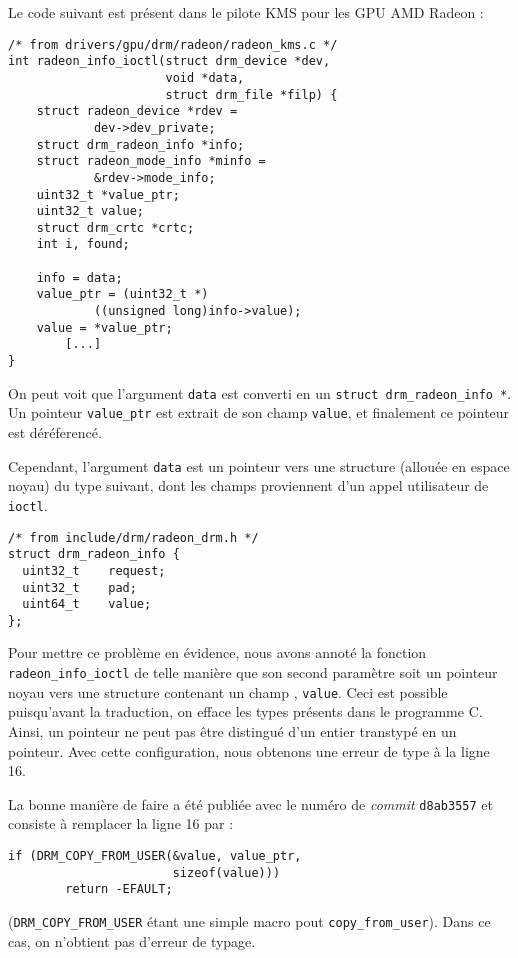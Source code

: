 Le code suivant est présent dans le pilote KMS pour les GPU AMD Radeon :

\begin{verbatim}
/* from drivers/gpu/drm/radeon/radeon_kms.c */
int radeon_info_ioctl(struct drm_device *dev,
                      void *data,
                      struct drm_file *filp) {
	struct radeon_device *rdev =
            dev->dev_private;
	struct drm_radeon_info *info;
	struct radeon_mode_info *minfo =
            &rdev->mode_info;
	uint32_t *value_ptr;
	uint32_t value;
	struct drm_crtc *crtc;
	int i, found;

	info = data;
	value_ptr = (uint32_t *)
            ((unsigned long)info->value);
	value = *value_ptr;
        [...]
}
\end{verbatim}

On peut voit que l'argument \texttt{data} est converti en un \texttt{struct
drm\_radeon\_info *}. Un pointeur \texttt{value\_ptr} est extrait de son champ
\texttt{value}, et finalement ce pointeur est déréferencé.

Cependant, l'argument \texttt{data} est un pointeur vers une structure (allouée
en espace noyau) du type suivant, dont les champs proviennent d'un appel
utilisateur de \texttt{ioctl}.

\begin{verbatim}
/* from include/drm/radeon_drm.h */
struct drm_radeon_info {
  uint32_t    request;
  uint32_t    pad;
  uint64_t    value;
};
\end{verbatim}

Pour mettre ce problème en évidence, nous avons annoté la fonction
\texttt{radeon\_info\_ioctl} de telle manière que son second paramètre soit un
pointeur noyau vers une structure contenant un champ \qUser, \texttt{value}.
Ceci est possible puisqu'avant la traduction, on efface les types présents dans
le programme C. Ainsi, un pointeur ne peut pas être distingué d'un entier
transtypé en un pointeur. Avec cette configuration, nous obtenons une erreur de
type à la ligne 16.

La bonne manière de faire a été publiée avec le numéro de \emph{commit}
\texttt{d8ab3557} et consiste à remplacer la ligne 16 par :

\begin{verbatim}
if (DRM_COPY_FROM_USER(&value, value_ptr,
                       sizeof(value)))
        return -EFAULT;
\end{verbatim}

(\texttt{DRM\_COPY\_FROM\_USER} étant une simple macro pout
\texttt{copy\_from\_user}). Dans ce cas, on n'obtient pas d'erreur de typage.

